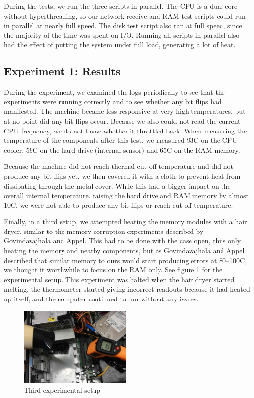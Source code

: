 \documentclass[conference]{IEEEtran}
\begin{document}
During the tests, we run the three scripts in parallel. The CPU is a dual core
without hyperthreading, so our network receive and RAM test scripts could run
in parallel at nearly full speed. The disk test script also ran at full speed,
since the majority of the time was spent on I/O. Running all scripts in
parallel also had the effect of putting the system under full load, generating
a lot of heat.

\subsection{Experiment 1: Results}\label{sub:exp1r}

During the experiment, we examined the logs periodically to see that the
experiments were running correctly and to see whether any bit flips had
manifested. The machine became less responsive at very high temperatures, but
at no point did any bit flips occur. Because we also could not read the current
CPU frequency, we do not know whether it throttled back. When measuring the
temperature of the components after this test, we measured 93\degree{}C on the
CPU cooler, 59\degree{}C on the hard drive (internal sensor) and 65\degree{}C
on the RAM memory.

Because the machine did not reach thermal cut-off temperature and did not
produce any bit flips yet, we then covered it with a cloth to prevent heat from
dissipating through the metal cover. While this had a bigger impact on the
overall internal temperature, raising the hard drive and RAM memory by almost
10\degree{}C, we were not able to produce any bit flips or reach cut-off
temperature.

Finally, in a third setup, we attempted heating the memory modules with a hair
dryer, similar to the memory corruption experiments described by Govindavajhala
and Appel\cite{jvm}. This had to be done with the case open, thus only heating
the memory and nearby components, but as Govindavajhala and Appel described
that similar memory to ours would start producing errors at 80--100\degree{}C,
we thought it worthwhile to focus on the RAM only. See figure
\ref{fig:hairdryer} for the experimental setup. This experiment was halted when
the hair dryer started melting, the thermometer started giving incorrect
readouts because it had heated up itself, and the computer continued to run
without any issues.

\begin{figure}
	\centering
	\includegraphics[width=0.49\textwidth]{hairdryer.jpg}
	\caption{Third experimental setup}
	\label{fig:hairdryer}
\end{figure}
\end{document}
